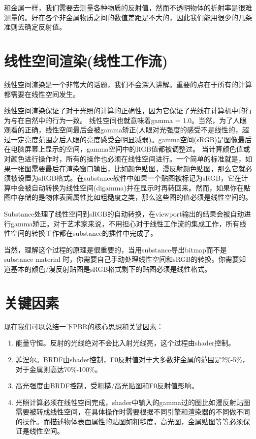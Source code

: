 和金属一样，我们需要去测量各种物质的反射值，然而不透明物体的折射率是很难测量的。好在各个非金属物质之间的数值差距是不大的，因此我们能用很少的几条准则去确定反射值。

\section{线性空间渲染(线性工作流)}

线性空间渲染是一个非常大的话题，我们不会深入讲解。重要的点在于所有的计算都需要在线性空间发生。

线性空间渲染保证了对于光照的计算的正确性，因为它保证了光线在计算机中的行为与在自然中的行为一致。
线性空间也就意味着gamma = 1.0。当然，为了人眼观看的正确，线性空间最后会被gamma矫正(人眼对光强度的感受不是线性的，超过一定亮度范围之后人眼的亮度感受会明显减弱)。gamma空间(sRGB)是图像最后在电脑屏幕上显示的空间，gamma空间中的RGB值都被调整过。
当计算颜色值或对颜色进行操作时，所有的操作也必须在线性空间进行。一个简单的标准就是，如果一张图需要最后在渲染窗口输出，比如颜色贴图，漫反射颜色贴图，那么它就必须被设置为sRGB格式。在substance软件中如果一个贴图被标记为sRGB，它在计算中会被自动转换为线性空间(digamma)并在显示时再转回来。然而，如果你在贴图中存储的是物体表面属性比如粗糙度之类，那么这些图的值必须是线性空间的。

Substance处理了线性空间到sRGB的自动转换，在viewport输出的结果会被自动进行gamma矫正。对于艺术家来说，不用担心对于线性工作流的集成工作，所有线性空间的转换工作都在substance的插件中完成了。

当然，理解这个过程的原理是很重要的，当用substance导出bitmap而不是substance material 时，你需要自己手动处理线性空间和sRGB的转换。你需要知道基本的颜色/漫反射贴图是sRGB格式剩下的贴图必须是线性格式。

\section{关键因素}

现在我们可以总结一下PBR的核心思想和关键因素：

\begin{enumerate}
\item 能量守恒。反射的光线绝对不会比入射光线亮，这个过程由shader控制。
\item 菲涅尔。BRDF由shader控制，F0反射值对于大多数非金属的范围是2\%-5\%，对于金属则高达70\%-100\%。
\item 高光强度由BRDF控制，受粗糙/高光贴图和F0反射值影响。
\item 光照计算必须在线性空间完成，shader中输入的gamma过的图比如漫反射贴图需要被转成线性空间，在具体操作时需要根据不同引擎和渲染器的不同做不同的操作。而描述物体表面属性的贴图如粗糙度，高光图，金属贴图等等必须保证是线性空间。
\end{enumerate}

